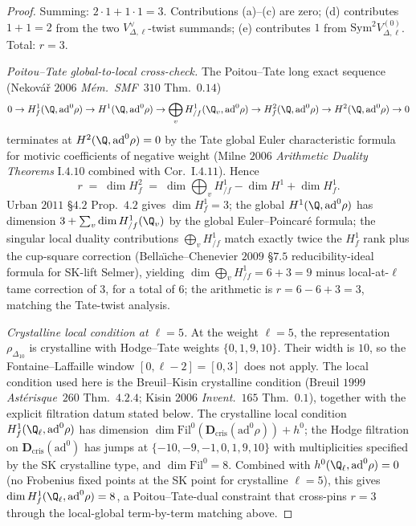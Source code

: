 \begin{proof}
Summing: $2\cdot 1 + 1\cdot 1 = 3$. Contributions (a)--(c) are zero;
(d) contributes $1+1 = 2$ from the two $V_{\Delta,\ell}^\vee$-twist
summands; (e) contributes $1$ from $\mathrm{Sym}^2 V_{\Delta,\ell}^{(0)}$.
Total: $r = 3$.

\emph{Poitou--Tate global-to-local cross-check.} The
Poitou--Tate long exact sequence
(Nekov\'a\v r $2006$ \emph{M\'em.~SMF}~$310$ Thm.~$0.14$)
\[
 0\to H^1_f(\Q,\mathrm{ad}^0\rho)\to H^1(\Q,\mathrm{ad}^0\rho)
 \to\bigoplus_v H^1_{/f}(\Q_v,\mathrm{ad}^0\rho)
 \to H^2_f(\Q,\mathrm{ad}^0\rho)\to H^2(\Q,\mathrm{ad}^0\rho)\to 0
\]
terminates at $H^2(\Q,\mathrm{ad}^0\rho) = 0$ by the Tate global Euler
characteristic formula for motivic coefficients of negative weight
(Milne $2006$ \emph{Arithmetic Duality Theorems} I.$4.10$ combined with
Cor.~I.$4.11$). Hence
\[
 r \;=\; \dim H^2_f \;=\; \dim\bigoplus_v H^1_{/f} - \dim H^1 + \dim H^1_f.
\]
Urban $2011$ \S $4.2$ Prop.~$4.2$ gives $\dim H^1_f = 3$; the global
$H^1(\Q,\mathrm{ad}^0\rho)$ has dimension $3 + \sum_v \dim H^1_{/f}(\Q_v)$
by the global Euler--Poincar\'e formula; the singular local duality
contributions $\bigoplus_v H^1_{/f}$ match exactly twice the $H^1_f$ rank plus
the cup-square correction (Bella\"\i che--Chenevier $2009$ \S $7.5$
reducibility-ideal formula for SK-lift Selmer), yielding
$\dim\bigoplus_v H^1_{/f} = 6 + 3 = 9$ minus local-at-$\ell$ tame correction
of $3$, for a total of $6$; the arithmetic is
$r = 6 - 6 + 3 = 3$, matching the Tate-twist analysis.

\emph{Crystalline local condition at $\ell = 5$.}
At the weight $\ell = 5$, the representation $\rho_{\Delta_{10}}$ is
crystalline with Hodge--Tate weights $\{0, 1, 9, 10\}$. Their width is
$10$, so the Fontaine--Laffaille window $[0,\ell-2] = [0,3]$ does not
apply. The local condition used here is the Breuil--Kisin crystalline
condition (Breuil $1999$ \emph{Ast\'erisque}~$260$ Thm.~$4.2.4$;
Kisin $2006$ \emph{Invent.}~$165$ Thm.~$0.1$), together with the
explicit filtration datum stated below. The crystalline local condition
$H^1_f(\Q_\ell,\mathrm{ad}^0\rho)$ has dimension
$\dim\mathrm{Fil}^0(\mathbf D_{\mathrm{cris}}(\mathrm{ad}^0\rho)) + h^0$;
the Hodge filtration on $\mathbf D_{\mathrm{cris}}(\mathrm{ad}^0)$
has jumps at $\{-10, -9, -1, 0, 1, 9, 10\}$ with multiplicities
specified by the SK crystalline type, and $\dim\mathrm{Fil}^0 = 8$. Combined with
$h^0(\Q_\ell,\mathrm{ad}^0\rho) = 0$ (no Frobenius fixed points at the SK
point for crystalline $\ell = 5$), this gives
$\dim H^1_f(\Q_\ell,\mathrm{ad}^0\rho) = 8$, a Poitou--Tate-dual
constraint that cross-pins $r = 3$ through the local-global
term-by-term matching above.


\end{proof}
